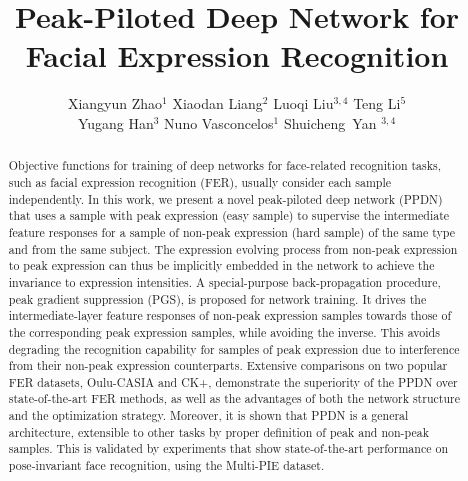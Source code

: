 \documentclass[runningheads]{llncs}
\begin{document}
\pagestyle{headings}
\mainmatter

\title{Peak-Piloted Deep Network for Facial Expression Recognition} %

\author{Xiangyun Zhao$^{1}$ \quad Xiaodan Liang$^{2}$ \quad Luoqi Liu$^{3,4}$ \quad Teng Li$^{5}$\\ \quad Yugang Han$^{3}$ \quad Nuno Vasconcelos$^{1}$ \quad Shuicheng~Yan $^{3,4}$}



\maketitle

\begin{abstract}
	
Objective functions for training of deep networks for face-related 
recognition tasks, such as facial expression recognition (FER), usually 
consider each sample independently. In this work, we present a novel 
peak-piloted deep network (PPDN) that uses a sample with peak 
expression (easy sample) to supervise the intermediate feature responses
for a sample of non-peak expression (hard sample) of the same type and from 
the same subject. The expression
evolving process from non-peak expression to peak expression can thus be
implicitly embedded in the network to achieve the invariance to expression intensities. A special-purpose back-propagation procedure, peak gradient
suppression (PGS), is proposed for network training. It drives the 
intermediate-layer feature responses of non-peak expression samples
towards those of the corresponding peak expression samples, while
avoiding the inverse. This avoids degrading the recognition capability for 
samples of peak expression due to interference from their non-peak expression 
counterparts. Extensive comparisons on two popular FER datasets, Oulu-CASIA
and CK+, demonstrate the superiority of the PPDN over state-of-the-art 
FER methods, as well as the advantages of both the network structure and 
the optimization strategy. Moreover, it is shown that PPDN is
a general architecture, extensible to other tasks by proper definition of 
peak and non-peak samples. This is validated by experiments that
show state-of-the-art performance on pose-invariant face recognition,
using the Multi-PIE dataset.


\end{abstract}
\end{document}
